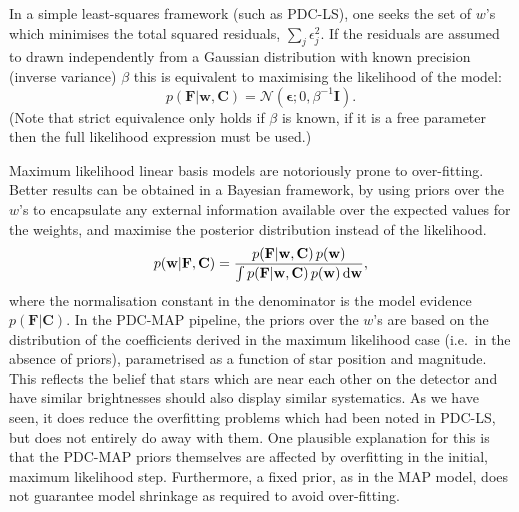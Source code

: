 \documentclass[useAMS,usenatbib]{mn2e}
\begin{document}
In a simple least-squares framework (such as PDC-LS), one seeks the
set of $w$'s which minimises the total squared residuals, $
\sum_j \epsilon_j^2 $. If the residuals are assumed to drawn
independently from a Gaussian distribution with known precision (inverse
variance) $\beta$ this is equivalent to
maximising the likelihood of the model:
\begin{equation}
p(\mathbf{F}|\mathbf{w},\mathbf{C}) =
\mathcal{N}(\boldsymbol{\epsilon};0,\beta^{-1} \mathbf{I}).
\end{equation}
(Note that strict equivalence only holds if $\beta$ is known, if it is
a free parameter then the full likelihood expression must be used.)

Maximum likelihood linear basis models are notoriously prone
to over-fitting. Better results can be obtained in a Bayesian
framework, by using
priors over the $w$'s to encapsulate any external information
available over the expected values for the weights, and maximise the
posterior distribution instead of the likelihood. 
\begin{equation}
p(\mathbf{w}|\mathbf{F},\mathbf{C}) =
\frac{p(\mathbf{F}|\mathbf{w},\mathbf{C})  \, p(\mathbf{w})}{\int
  p(\mathbf{F}|\mathbf{w},\mathbf{C}) \, p(\mathbf{w}) \, {\rm d}\mathbf{w}},
\end{equation} 
where the normalisation constant in the denominator is the model
evidence $p(\mathbf{F}|\mathbf{C})$. In the PDC-MAP pipeline, the priors over
the $w$'s are based on the distribution of the coefficients derived in
the maximum likelihood case (i.e.\ in the absence of priors),
parametrised as a function of star position and magnitude. This
reflects the belief that stars which are near each other on the
detector and have similar brightnesses should also display similar
systematics. As we have seen, it does reduce the overfitting problems
which had been noted in PDC-LS, but does not entirely do away with
them. One plausible explanation for this is that the PDC-MAP priors
themselves are affected by overfitting in the initial, maximum
likelihood step. Furthermore, a fixed prior, as in the MAP model,
does not guarantee model shrinkage as required to avoid over-fitting. 
\end{document}
